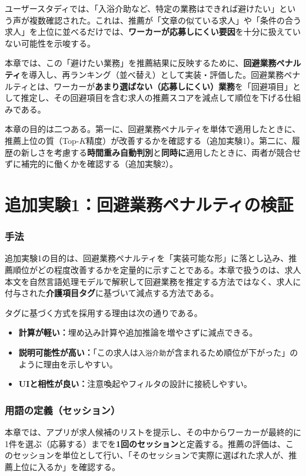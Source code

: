 ユーザースタディでは、「入浴介助など、特定の業務はできれば避けたい」という声が複数確認された。これは、推薦が「文章の似ている求人」や「条件の合う求人」を上位に並べるだけでは、\textbf{ワーカーが応募しにくい要因}を十分に扱えていない可能性を示唆する。

本章では、この「避けたい業務」を推薦結果に反映するために、\textbf{回避業務ペナルティ}を導入し、再ランキング（並べ替え）として実装・評価した。回避業務ペナルティとは、ワーカーが\textbf{あまり選ばない（応募しにくい）業務}を「回避項目」として推定し、その回避項目を含む求人の推薦スコアを減点して順位を下げる仕組みである。

本章の目的は二つある。第一に、回避業務ペナルティを単体で適用したときに、推薦上位の質（Top-$K$精度）が改善するかを確認する（追加実験1）。第二に、履歴の新しさを考慮する\textbf{時間重み自動判別}と\textbf{同時に}適用したときに、両者が競合せずに補完的に働くかを確認する（追加実験2）。

\section{追加実験1：回避業務ペナルティの検証}
\subsubsection*{手法}
追加実験1の目的は、回避業務ペナルティを「実装可能な形」に落とし込み、推薦順位がどの程度改善するかを定量的に示すことである。本章で扱うのは、求人本文を自然言語処理モデルで解釈して回避業務を推定する方法ではなく、求人に付与された\textbf{介護項目タグ}に基づいて減点する方法である。

タグに基づく方式を採用する理由は次の通りである。
\begin{itemize}
\item \textbf{計算が軽い：}埋め込み計算や追加推論を増やさずに減点できる。
\item \textbf{説明可能性が高い：}「この求人は\texttt{入浴介助}が含まれるため順位が下がった」のように理由を示しやすい。
\item \textbf{UIと相性が良い：}注意喚起やフィルタの設計に接続しやすい。
\end{itemize}

\subsubsection*{用語の定義（セッション）}
本章では、アプリが求人候補のリストを提示し、その中からワーカーが最終的に1件を選ぶ（応募する）までを\textbf{1回のセッション}と定義する。推薦の評価は、このセッションを単位として行い、「そのセッションで実際に選ばれた求人が、推薦上位に入るか」を確認する。

